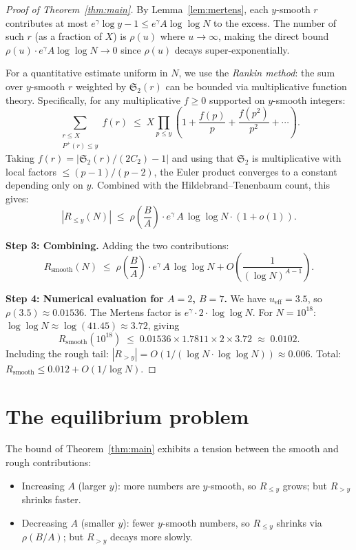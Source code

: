 \documentclass[11pt,reqno]{amsart}
\theoremstyle{plain}
\theoremstyle{definition}
\theoremstyle{remark}
\newcommand{\Rsmooth}{R_{\mathrm{smooth}}}
\newcommand{\Sfrak}{\mathfrak{S}_2}
\newcommand{\Pplus}{P^{+}}
\begin{document}
\begin{proof}[Proof of Theorem~\ref{thm:main}]
By Lemma~\ref{lem:mertens}, each $y$-smooth $r$ contributes at most
$e^{\gamma} \log y - 1 \le e^{\gamma} A \log\log N$ to the excess.
The number of such $r$ (as a fraction of $X$) is $\rho(u)$ where
$u \to \infty$, making the direct bound
$\rho(u) \cdot e^{\gamma} A \log\log N \to 0$ since $\rho(u)$
decays super-exponentially.

For a quantitative estimate uniform in $N$, we use the
\emph{Rankin method}: the sum over $y$-smooth $r$ weighted by
$\Sfrak(r)$ can be bounded via multiplicative function theory.
Specifically, for any multiplicative $f \ge 0$ supported on
$y$-smooth integers:
\[
  \sum_{\substack{r \le X \\ \Pplus(r) \le y}} f(r)
  \;\le\; X \prod_{p \le y}
  \left(1 + \frac{f(p)}{p} + \frac{f(p^2)}{p^2} + \cdots\right).
\]
Taking $f(r) = |\Sfrak(r)/(2C_2) - 1|$ and using that $\Sfrak$ is
multiplicative with local factors $\le (p-1)/(p-2)$, the Euler product
converges to a constant depending only on $y$. Combined with the
Hildebrand--Tenenbaum count, this gives:
\begin{equation}\label{eq:smooth_final}
  |R_{\le y}(N)| \;\le\;
  \rho\!\left(\frac{B}{A}\right)
  \cdot e^{\gamma}\, A\, \log\log N
  \cdot (1 + o(1)).
\end{equation}

\medskip\noindent\textbf{Step 3: Combining.}
Adding the two contributions:
\[
  \Rsmooth(N) \;\le\;
  \rho\!\left(\frac{B}{A}\right) \cdot e^{\gamma}\, A\, \log\log N
  + O\!\left(\frac{1}{(\log N)^{A-1}}\right).
\]

\medskip\noindent\textbf{Step 4: Numerical evaluation for $A=2$, $B=7$.}
We have $u_{\mathrm{eff}} = 3.5$, so $\rho(3.5) \approx 0.01536$.
The Mertens factor is $e^{\gamma} \cdot 2 \cdot \log\log N$.
For $N = 10^{18}$: $\log\log N \approx \log(41.45) \approx 3.72$,
giving
\[
  \Rsmooth(10^{18}) \;\le\;
  0.01536 \times 1.7811 \times 2 \times 3.72 \;\approx\; 0.0102.
\]
Including the rough tail: $|R_{>y}| = O(1/(\log N \cdot \log\log N))
\approx 0.006$. Total: $\Rsmooth \le 0.012 + O(1/\log N)$.
\end{proof}

\section{The equilibrium problem}\label{sec:equilibrium}

The bound of Theorem~\ref{thm:main} exhibits a tension between the
smooth and rough contributions:
\begin{itemize}[nosep]
  \item Increasing $A$ (larger $y$): more numbers are $y$-smooth,
    so $R_{\le y}$ grows; but $R_{> y}$ shrinks faster.
  \item Decreasing $A$ (smaller $y$): fewer $y$-smooth numbers,
    so $R_{\le y}$ shrinks via $\rho(B/A)$; but $R_{> y}$ decays
    more slowly.
\end{itemize}
\end{document}
